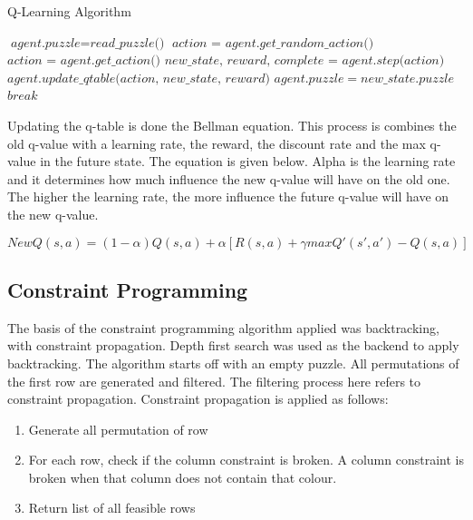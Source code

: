 \documentclass{svproc}
\begin{document}
\begin{algorithm}
	\caption{Q-Learning Algorithm}\label{euclid}
	\begin{algorithmic}[1]
		\State $\textit{agent.puzzle} = \textit{read\_puzzle()}$
		\State $\textit{action = agent.get\_random\_action()}$
		\Else
		\State $\textit{action = agent.get\_action()}$
		\EndIf
		\State $\textit{new\_state, reward, complete = agent.step(action)}$
		\State $\textit{agent.update\_qtable(action, new\_state, reward)}$
		\State $agent.puzzle = new\_state.puzzle$
		\State $\textit{break}$
		\EndIf
		\EndFor
		\EndFor
	\end{algorithmic}
\end{algorithm}

Updating the q-table is done the Bellman equation. This process is combines the old q-value with a learning rate, the reward, the discount rate and the max q-value in the future state. The equation is given below. Alpha is the learning rate and it determines how much influence the new q-value will have on the old one. The higher the learning rate, the more influence the future q-value will have on the new q-value.

\begin{equation}
	NewQ(s, a) = (1 - \alpha)Q(s,a) + \alpha[R(s,a) + \gamma maxQ'(s', a') - Q(s,a)]
\end{equation}

\subsection{Constraint Programming}
The basis of the constraint programming algorithm applied was backtracking, with constraint propagation. Depth first search was used as the backend to apply backtracking. The algorithm starts off with an empty puzzle. All permutations of the first row are generated and filtered. The filtering process here refers to  constraint propagation. Constraint propagation is applied as follows:

\begin{enumerate}
    \item Generate all permutation of row
    \item For each row, check if the column constraint is broken. A column constraint is broken when that column does not contain that colour.
    \item Return list of all feasible rows
\end{enumerate}
\end{document}
